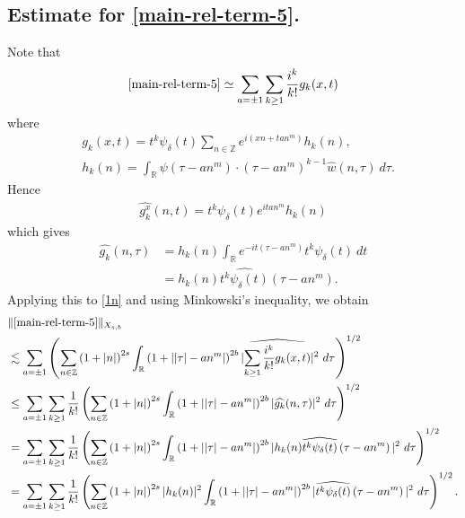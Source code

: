 \documentclass[12pt,reqno]{amsart}
\numberwithin{equation}{section}  %
\newcommand{\rr}{\mathbb{R}}
\newcommand{\zz}{\mathbb{Z}}
\newcommand{\wh}{\widehat}
\begin{document}
\subsection{Estimate for \eqref{main-rel-term-5}.}
Note that
%
%
\begin{equation}
	\label{1n}
	\begin{split}
    \eqref{main-rel-term-5} \simeq \sum_{a = \pm 1}\sum_{k \ge 1}
		\frac{i^k}{k!}g_k(x,t)
	\end{split}
\end{equation}
%
%
where 
%
%
\begin{equation*}
	\begin{split}
		& g_k(x,t) = t^k \psi_{\delta}(t) \sum_{n \in \zz} e^{i\left( xn + ta n^{m}
		\right)} h_k(n),
		\\
		& h_k(n) = \int_\rr \psi \left( \tau - an^{m } \right) \cdot \left(
		\tau - an^{m } \right)^{k -1} \wh{w}(n, \tau) \ d \tau.
	\end{split}
\end{equation*}
%
%
Hence
%
%
\begin{equation*}
	\begin{split}
		\wh{g_k^x}(n, t) = t^{k} \psi_{\delta}(t) e^{i t an^{m }} h_k(n)
	\end{split}
\end{equation*}
%
%
which gives
%
%
\begin{equation*}
	\begin{split}
		\wh{g_k}(n, \tau)
		& = h_k(n) \int_\rr e^{-it\left( \tau - an^{m } \right)}
		t^{k}\psi_{\delta}(t) \ dt
		\\
		& = h_k(n) \wh{t^{k}\psi_{\delta}(t)} \left( \tau - an^{m } \right).
	\end{split}
\end{equation*}
%
%
Applying this to \eqref{1n} and using Minkowski's inequality, we obtain
%
%
\begin{equation}
	\label{2n}
	\begin{split}
		& \|\eqref{main-rel-term-5}\|_{X_{s,b}} 
    \\
    & \lesssim \sum_{a = \pm 1} \left( \sum_{n \in \zz} \left (1 + |n| \right )^{2s}
    \int_\rr \left( 1 + | |\tau| - an^{m } | \right)^{2b}
    | \wh{\sum_{k \ge 1} \frac{i^k}{k!}g_k(x,t)} |^2 \ d \tau
		\right)^{1/2}
		\\
		& \le \sum_{a = \pm 1}\sum_{k \ge 1} \frac{1}{k!}\left( \sum_{n \in \zz} \left (1 + |n| \right )^{2s}
    \int_\rr \left( 1 + | |\tau| - an^{m } | \right)^{2b} | \wh{g_k}(n, \tau) |^2 \
		d \tau \right)^{1/2}
		\\
		& = \sum_{a = \pm 1}\sum_{k \ge 1} \frac{1}{k!} \left( \sum_{n \in \zz} \left (1 + |n| \right )^{2s}
    \int_\rr \left( 1 + | |\tau| - an^{m } | \right)^{2b} | h_k(n) \wh{t^k
		\psi_{\delta}(t)} \left( \tau - an^{m } \right) |^2 \ d \tau \right)^{1/2}
		\\
		& = \sum_{a = \pm 1}\sum_{k \ge 1} \frac{1}{k!} \left( \sum_{n \in \zz} \left (1 + |n| \right )^{2s} |
    h_k(n) |^2 \int_\rr \left( 1 + | |\tau| - an^{m } | \right)^{2b} | \wh{t^k
		\psi_{\delta}(t)} \left( \tau - an^{m } \right) |^2 \ d \tau \right)^{1/2}.
	\end{split}
\end{equation}
\end{document}
